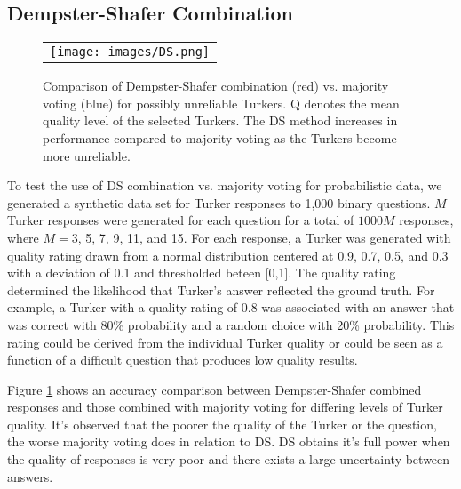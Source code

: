 \subsection{Dempster-Shafer Combination}

\begin{figure}
\begin{center}
\begin{tabular}{c}
\texttt{[image: images/DS.png]}
\end{tabular}
\end{center}
\caption[example] { 
\label{fig:DS} 
Comparison of Dempster-Shafer combination (red) vs. majority voting (blue) for possibly unreliable Turkers.  Q denotes the mean quality level of the selected Turkers.  The DS method increases in performance compared to majority voting as the Turkers become more unreliable.
}
\end{figure} 

To test the use of DS combination vs. majority voting for probabilistic data, we generated a synthetic data set for Turker responses to 1,000 binary questions.  $M$ Turker responses were generated for each question for a total of $1000M$ responses, where $M = $3, 5, 7, 9, 11, and 15.  For each response, a Turker was generated with quality rating drawn from a normal distribution centered at 0.9, 0.7, 0.5, and 0.3 with a deviation of 0.1 and thresholded beteen [0,1].  The quality rating determined the likelihood that Turker's answer reflected the ground truth.  For example, a Turker with a quality rating of 0.8 was associated with an answer that was correct with 80\% probability and a random choice with 20\% probability.  This rating could be derived from the individual Turker quality or could be seen as a function of a difficult question that produces low quality results.

Figure \ref{fig:DS} shows an accuracy comparison between Dempster-Shafer combined responses and those combined with majority voting for differing levels of Turker quality.  It's observed that the poorer the quality of the Turker or the question, the worse majority voting does in relation to DS.  DS obtains it's full power when the quality of responses is very poor and there exists a large uncertainty between answers.
